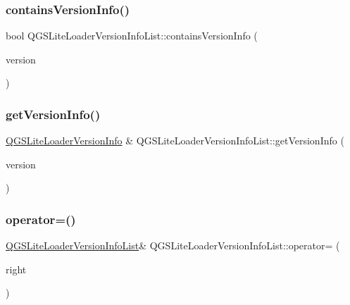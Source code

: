 \subsubsection{\texorpdfstring{contains\+Version\+Info()}{containsVersionInfo()}}
{\footnotesize\ttfamily bool Q\+G\+S\+Lite\+Loader\+Version\+Info\+List\+::contains\+Version\+Info (\begin{DoxyParamCaption}\item[{const Q\+String \&}]{version }\end{DoxyParamCaption})}

\mbox{\label{class_q_g_s_lite_loader_version_info_list_aaed1de24fed01d1c52f9e0d5179e9467}} 
\subsubsection{\texorpdfstring{get\+Version\+Info()}{getVersionInfo()}}
{\footnotesize\ttfamily \mbox{\hyperlink{class_q_g_s_lite_loader_version_info}{Q\+G\+S\+Lite\+Loader\+Version\+Info}} \& Q\+G\+S\+Lite\+Loader\+Version\+Info\+List\+::get\+Version\+Info (\begin{DoxyParamCaption}\item[{const Q\+String \&}]{version }\end{DoxyParamCaption})}

\mbox{\label{class_q_g_s_lite_loader_version_info_list_aa5d7b86337fafba6544d6aaf76b512b2}} 
\subsubsection{\texorpdfstring{operator=()}{operator=()}\hspace{0.1cm}{\footnotesize\ttfamily [1/2]}}
{\footnotesize\ttfamily \mbox{\hyperlink{class_q_g_s_lite_loader_version_info_list}{Q\+G\+S\+Lite\+Loader\+Version\+Info\+List}}\& Q\+G\+S\+Lite\+Loader\+Version\+Info\+List\+::operator= (\begin{DoxyParamCaption}\item[{const \mbox{\hyperlink{class_q_g_s_lite_loader_version_info_list}{Q\+G\+S\+Lite\+Loader\+Version\+Info\+List}} \&}]{right }\end{DoxyParamCaption})\hspace{0.3cm}{\ttfamily [default]}}

